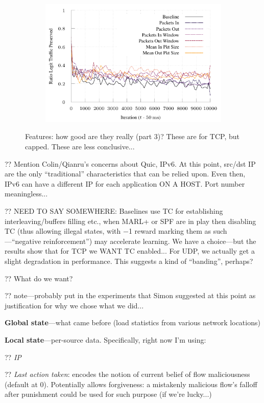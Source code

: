 \documentclass[conference, letterpaper, 10pt, times]{IEEEtran}
\begin{document}
\begin{figure}
\begin{subfigure}{0.32\linewidth}
		\includegraphics[width=\linewidth]{../plots/ftprep-tcp-cap-good-3}
	\end{subfigure}
	
	\caption{
		Features: how good are they really (part 3)? These are for TCP, but capped. These are less conclusive...
		\label{fig:tcp-cap-feature-plots}
	}
\end{figure}

?? Mention Colin/Qianru's concerns about Quic, IPv6. At this point, src/dst IP are the only ``traditional'' characteristics that can be relied upon. Even then, IPv6 can have a different IP for each application ON A HOST. Port number meaningless...

?? NEED TO SAY SOMEWHERE: Baselines use TC for establishing interleaving/buffers filling etc., when MARL+ or SPF are in play then disabling TC (thus allowing illegal states, with \num{-1} reward marking them as such---``negative reinforcement'') may accelerate learning. We have a choice---but the results show that for TCP we WANT TC enabled... For UDP, we actually get a slight degradation in performance. This suggests a kind of ``banding'', perhaps?

?? What do we want?

?? note---probably put in the experiments that Simon suggested at this point as justification for why we chose what we did...

\textbf{Global state}---what came before (load statistics from various network locations)

\textbf{Local state}---per-source data. Specifically, right now I'm using:

?? \emph{IP}

?? \emph{Last action taken}: encodes the notion of current belief of flow maliciousness (default at 0). Potentially allows forgiveness: a mistakenly malicious flow's falloff after punishment could be used for such purpose (if we're lucky...)
\end{document}
